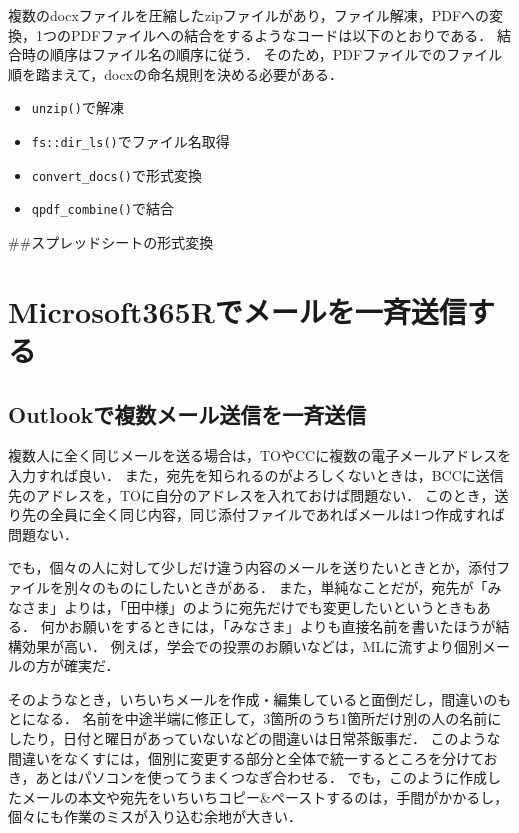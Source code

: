 \documentclass[
]{article}
\providecommand{\tightlist}{%
  \setlength{\itemsep}{0pt}\setlength{\parskip}{0pt}}
\begin{document}
複数のdocxファイルを圧縮したzipファイルがあり，ファイル解凍，PDFへの変換，1つのPDFファイルへの結合をするようなコードは以下のとおりである．
結合時の順序はファイル名の順序に従う．
そのため，PDFファイルでのファイル順を踏まえて，docxの命名規則を決める必要がある．

\begin{itemize}
\tightlist
\item
  \texttt{unzip()}で解凍\\
\item
  \texttt{fs::dir\_ls()}でファイル名取得\\
\item
  \texttt{convert\_docs()}で形式変換\\
\item
  \texttt{qpdf\_combine()}で結合
\end{itemize}

\#\#スプレッドシートの形式変換

\hypertarget{microsoft365r}{%
\section{Microsoft365Rでメールを一斉送信する}\label{microsoft365r}}

\hypertarget{outlookux3067ux8907ux6570ux30e1ux30fcux30ebux9001ux4fe1ux3092ux4e00ux6589ux9001ux4fe1}{%
\subsection{Outlookで複数メール送信を一斉送信}\label{outlookux3067ux8907ux6570ux30e1ux30fcux30ebux9001ux4fe1ux3092ux4e00ux6589ux9001ux4fe1}}

複数人に全く同じメールを送る場合は，TOやCCに複数の電子メールアドレスを入力すれば良い．
また，宛先を知られるのがよろしくないときは，BCCに送信先のアドレスを，TOに自分のアドレスを入れておけば問題ない．
このとき，送り先の全員に全く同じ内容，同じ添付ファイルであればメールは1つ作成すれば問題ない．

でも，個々の人に対して少しだけ違う内容のメールを送りたいときとか，添付ファイルを別々のものにしたいときがある．
また，単純なことだが，宛先が「みなさま」よりは，「田中様」のように宛先だけでも変更したいというときもある．
何かお願いをするときには，「みなさま」よりも直接名前を書いたほうが結構効果が高い．
例えば，学会での投票のお願いなどは，MLに流すより個別メールの方が確実だ．

そのようなとき，いちいちメールを作成・編集していると面倒だし，間違いのもとになる．
名前を中途半端に修正して，3箇所のうち1箇所だけ別の人の名前にしたり，日付と曜日があっていないなどの間違いは日常茶飯事だ．
このような間違いをなくすには，個別に変更する部分と全体で統一するところを分けておき，あとはパソコンを使ってうまくつなぎ合わせる．
でも，このように作成したメールの本文や宛先をいちいちコピー\&ペーストするのは，手間がかかるし，個々にも作業のミスが入り込む余地が大きい．
\end{document}
